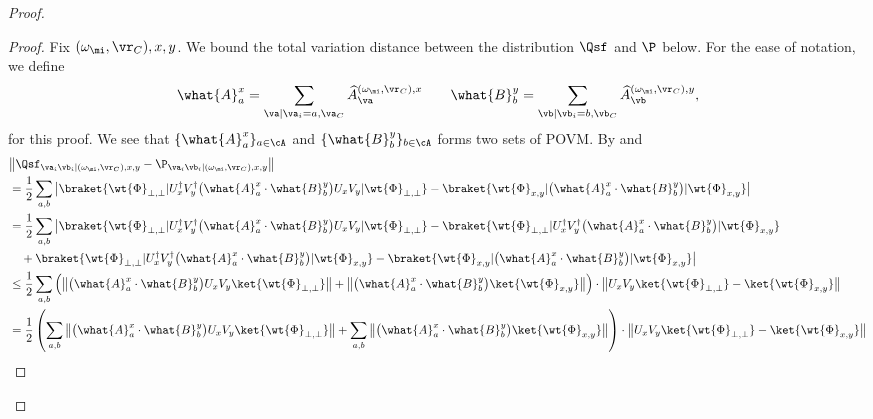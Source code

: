 \begin{proof}
	\begin{proof}
		Fix $(\omega_{\mi}, \vr_C), x,y$. We bound the total variation distance between the distribution $\Qsf$ and $\P$ below. For the ease of notation, we define
		\begin{equation*}
			\what{A}^{x}_a =  \sum_{\va | \va_i = a, \va_C} \widehat{A}^{(\omega_{\mi}, \vr_C), x}_\va \qquad  	\what{B}^{y}_b =  \sum_{\vb | \vb_i = b, \vb_C} \widehat{A}^{(\omega_{\mi}, \vr_C), y}_\vb,
		\end{equation*}
	for this proof. We see that $\{	\what{A}^{x}_a \}_{a \in \cA}$ and $\{	\what{B}^{y}_b \}_{b \in \cA}$ forms two sets of POVM. By  and  
		\begin{align}
			&\big \| \Qsf_{\va_i \vb_i | (\omega_{\mi}, \vr_C), x,y} - \P_{\va_i \vb_i | (\omega_{\mi}, \vr_C),x,y}\big \|	\notag\\
			&= \frac{1}{2} \sum_{a,b}\big | \braket{\wt{\Phi}_{\bot, \bot}|  U_{x}^\dagger  V_{y}^\dagger\big ( \what{A}^{x}_a \cdot\what{B}^{y}_b \big ) U_{x}  V_{y}|\wt{\Phi}_{\bot, \bot}} -  \braket{\wt{\Phi}_{x,y} | \big ( \what{A}^{x}_a \cdot\what{B}^{y}_b \big ) |\wt{\Phi}_{x,y}  }	\big |
			\notag\\
			&= \frac{1}{2} \sum_{a,b}\big | \braket{\wt{\Phi}_{\bot, \bot}|  U_{x}^\dagger  V_{y}^\dagger \big( \what{A}^{x}_a \cdot\what{B}^{y}_b \big ) U_{x}  V_{y}|\wt{\Phi}_{\bot, \bot}} - \braket{\wt{\Phi}_{\bot, \bot}|  U_{x}^\dagger  V_{y}^\dagger\big ( \what{A}^{x}_a \cdot\what{B}^{y}_b \big) |\wt{\Phi}_{x, y}} \notag \\
			&\quad + \braket{\wt{\Phi}_{\bot, \bot}|  U_{x}^\dagger  V_{y}^\dagger \big( \what{A}^{x}_a \cdot\what{B}^{y}_b \big) |\wt{\Phi}_{x, y}} -	\braket{\wt{\Phi}_{x,y} | \big( \what{A}^{x}_a \cdot\what{B}^{y}_b \big) |\wt{\Phi}_{x,y}  }	\big | \notag \\
			&\leq \frac{1}{2}  \sum_{a,b} \left( \big \| \big( \what{A}^{x}_a \cdot\what{B}^{y}_b \big) U_{x}  V_{y}\ket{\wt{\Phi}_{\bot, \bot}}  \big \|  + \big \| \big( \what{A}^{x}_a \cdot\what{B}^{y}_b \big)\ket{\wt{\Phi}_{x, y}}  \big \| \right) \cdot  \big\| U_{x}  V_{y} \ket{\wt{\Phi}_{\bot,\bot}} - \ket{\wt{\Phi}_{x,y}} \big\| \notag \\
			&=  \frac{1}{2}  \left(  \sum_{a,b} \big \| \big( \what{A}^{x}_a \cdot\what{B}^{y}_b \big) U_{x}  V_{y}\ket{\wt{\Phi}_{\bot, \bot}}  \big \|  +  \sum_{a,b} \big \| \big( \what{A}^{x}_a \cdot\what{B}^{y}_b \big)\ket{\wt{\Phi}_{x, y}}  \big \| \right) \cdot  \big\| U_{x}  V_{y} \ket{\wt{\Phi}_{\bot,\bot}} - \ket{\wt{\Phi}_{x,y}} \big\| \notag \\

\end{align}
\end{proof}
\end{proof}
